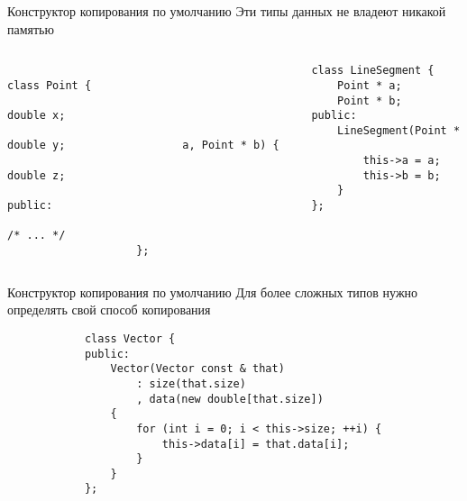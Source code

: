 \documentclass[aspectratio=169,14pt]{beamer}
\begin{document}
    \begin{frame}[fragile]{Конструктор копирования по умолчанию}
        Эти типы данных не владеют никакой памятью
        \begin{columns}[T]
            \begin{column}{0.4\textwidth}
                \begin{verbatim}
                    class Point {
                        double x;
                        double y;
                        double z;
                    public:
                        /* ... */
                    };
                \end{verbatim}
            \end{column}
            \begin{column}{0.6\textwidth}
                \begin{verbatim}
                    class LineSegment {
                        Point * a;
                        Point * b;
                    public:
                        LineSegment(Point * a, Point * b) {
                            this->a = a;
                            this->b = b;
                        }
                    };
                \end{verbatim}
            \end{column}
        \end{columns}
    \end{frame}

    \begin{frame}[fragile]{Конструктор копирования по умолчанию}
        Для более сложных типов нужно определять свой способ копирования
        \begin{verbatim}
            class Vector {
            public:
                Vector(Vector const & that)
                    : size(that.size)
                    , data(new double[that.size])
                {
                    for (int i = 0; i < this->size; ++i) {
                        this->data[i] = that.data[i];
                    }
                }
            };
        \end{verbatim}
    \end{frame}
\end{document}
